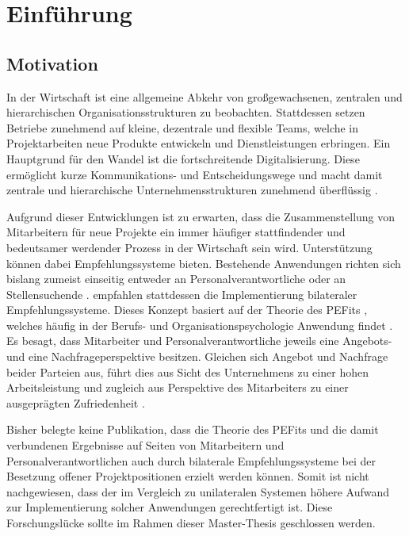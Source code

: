 \chapter{Einführung}
\label{ch:intro}

\section{Motivation}
\label{sec:intro:motivation}
In der Wirtschaft ist eine allgemeine Abkehr von großgewachsenen, zentralen und hierarchischen Organisationsstrukturen zu beobachten. Stattdessen setzen Betriebe zunehmend auf kleine, dezentrale und flexible Teams, welche in Projektarbeiten neue Produkte entwickeln und Dienstleistungen erbringen. Ein Hauptgrund für den Wandel ist die fortschreitende Digitalisierung. Diese ermöglicht kurze Kommunikations- und Entscheidungswege und macht damit zentrale und hierarchische Unternehmensstrukturen zunehmend überflüssig \cite[S. 2ff.]{elanceEconomy:1999}.

Aufgrund dieser Entwicklungen ist zu erwarten, dass die Zusammenstellung von Mitarbeitern für neue Projekte ein immer häufiger stattfindender und bedeutsamer werdender Prozess in der Wirtschaft sein wird. Unterstützung können dabei Empfehlungssysteme bieten. Bestehende Anwendungen richten sich bislang zumeist einseitig entweder an Personalverantwortliche oder an Stellensuchende \cite[S. 2f.]{siting:2012}. \textcite[S. 1ff.]{malinowski:2006} empfahlen stattdessen die Implementierung bilateraler Empfehlungssysteme. Dieses Konzept basiert auf der Theorie des \aclp{PEFit} \cite[S. 3.f]{malinowski:2006}, welches häufig in der Berufs- und Organisationspsychologie Anwendung findet \cite[S. 2]{guan:2021}. Es besagt, dass Mitarbeiter und Personalverantwortliche jeweils eine Angebots- und eine Nachfrageperspektive besitzen. Gleichen sich Angebot und Nachfrage beider Parteien aus, führt dies aus Sicht des Unternehmens zu einer hohen Arbeitsleistung und zugleich aus Perspektive des Mitarbeiters zu einer ausgeprägten Zufriedenheit \cite[S. 6]{su:2015}.

Bisher belegte keine Publikation, dass die Theorie des \aclp{PEFit} und die damit verbundenen Ergebnisse auf Seiten von Mitarbeitern und Personalverantwortlichen auch durch bilaterale Empfehlungssysteme bei der Besetzung offener Projektpositionen erzielt werden können. Somit ist nicht nachgewiesen, dass der im Vergleich zu unilateralen Systemen höhere Aufwand zur Implementierung solcher Anwendungen gerechtfertigt ist. Diese Forschungslücke sollte im Rahmen dieser Master-Thesis geschlossen werden.

